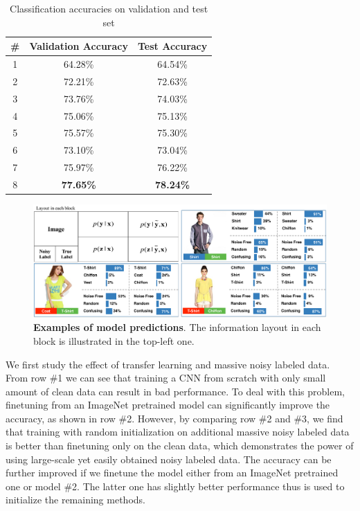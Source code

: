 \documentclass[10pt,twocolumn,letterpaper]{article}
\begin{document}
\begin{table}
\begin{center}
\begin{tabular}{c|c|c}
\hline
\# & Validation Accuracy & Test Accuracy \\
\hline\hline
1 & 64.28\% & 64.54\% \\
\hline
2 & 72.21\% & 72.63\% \\
\hline
3 & 73.76\% & 74.03\% \\
\hline
4 & 75.06\% & 75.13\% \\
\hline
5 & 75.57\% & 75.30\% \\
\hline
6 & 73.10\% & 73.04\% \\
\hline
7 & 75.97\% & 76.22\% \\
\hline
8 & \textbf{77.65\%} & \textbf{78.24\%} \\
\hline
\end{tabular}
\end{center}
\caption{Classification accuracies on validation and test set}
\label{tab:accuracy}
\end{table}

\begin{figure}
\begin{center}
\end{center}
\includegraphics[width=1.0\linewidth]{figure/model_output.pdf}
\caption{\textbf{Examples of model predictions}. The information layout in each block is illustrated in the top-left one.}
\label{fig:model_output}
\end{figure}

We first study the effect of transfer learning and massive noisy labeled data. From row \#1 we can see that training a CNN from scratch with only small amount of clean data can result in bad performance. To deal with this problem, finetuning from an ImageNet pretrained model can significantly improve the accuracy, as shown in row \#2. However, by comparing row \#2 and \#3, we find that training with random initialization on additional massive noisy labeled data is better than finetuning only on the clean data, which demonstrates the power of using large-scale yet easily obtained noisy labeled data. The accuracy can be further improved if we finetune the model either from an ImageNet pretrained one or model \#2. The latter one has slightly better performance thus is used to initialize the remaining methods.
\end{document}

